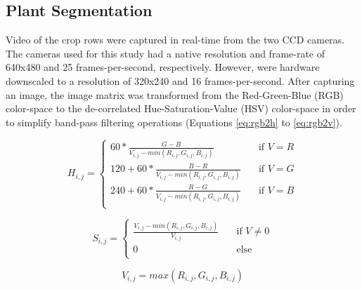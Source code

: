 \documentclass[authoryear]{elsarticle}
\begin{document}
\subsection{Plant Segmentation}
Video of the crop rows were captured in real-time from the two CCD
cameras. The cameras used for this study had a native resolution and
frame-rate of 640x480 and 25 frames-per-second, respectively. However,
were hardware downscaled to a resolution of 320x240 and 16
frames-per-second. After capturing an image, the image matrix was
transformed from the Red-Green-Blue (RGB) color-space to the
de-correlated Hue-Saturation-Value (HSV) color-space in order to
simplify band-pass filtering operations (Equations \ref{eq:rgb2h} to \ref{eq:rgb2v}).

\begin{equation}
  H_{i,j} =
  \begin{cases}
    60 * \frac{G-B}{V_{i,j}-min(R_{i,j},G_{i,j},B_{i,j})} & \quad \text{if } V = R \\
    120 + 60 * \frac{B-R}{V_{i,j}-min(R_{i,j},G_{i,j},B_{i,j})} & \quad \text{if } V = G \\
    240 + 60 * \frac{R-G}{V_{i,j}-min(R_{i,j},G_{i,j},B_{i,j})} & \quad \text{if } V = B \\
  \end{cases}
  \label{eq:rgb2h}
\end{equation}

\begin{equation}
  S_{i,j} = 
  \begin{cases}
    \frac{V_{i,j}-min(R_{i,j},G_{i,j},B_{i,j})}{V_{i,j}}  & \quad \text{if } V \neq 0 \\
    0  & \quad \text{else}\\
  \end{cases}
  \label{eq:rgb2s}
\end{equation}

\begin{equation}
  V_{i,j} = max(R_{i,j},G_{i,j},B_{i,j})
  \label{eq:rgb2v}
\end{equation}
\end{document}
